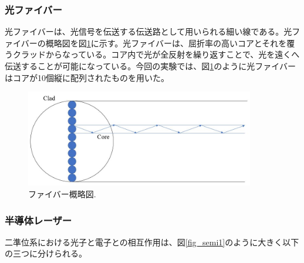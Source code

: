 \documentclass[11pt,a4j]{jsarticle}
\begin{document}
\newpage
\subsubsection{光ファイバー}
光ファイバーは、光信号を伝送する伝送路として用いられる細い線である。光ファイバーの概略図を図\ref{fig_fibor1}に示す。光ファイバーは、屈折率の高いコアとそれを覆うクラッドからなっている。コア内で光が全反射を繰り返すことで、光を遠くへ伝送することが可能になっている\cite{Fibor}。今回の実験では、図\ref{fig_fibor1}のように光ファイバーはコアが10個縦に配列されたものを用いた。

\begin{figure}[h]
 \centering
 \includegraphics[clip,width=10cm]{start_fibor.jpg}
 \caption{ファイバー概略図.}
 \label{fig_fibor1}
\end{figure}

\subsubsection{半導体レーザー}
二準位系における光子と電子との相互作用は、図\ref{fig_semi1}のように大きく以下の三つに分けられる。
\end{document}
